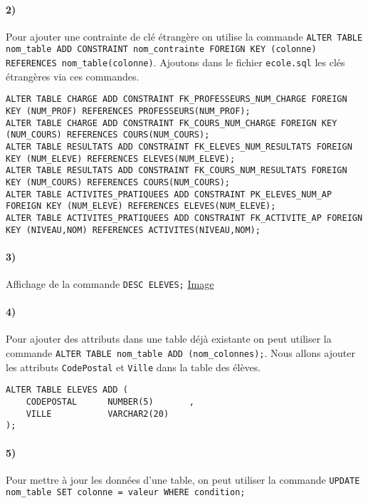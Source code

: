 \documentclass{report}
\begin{document}
\paragraph{2)}Pour ajouter une contrainte de clé étrangère on utilise la commande {\tt ALTER TABLE nom\_table ADD CONSTRAINT nom\_contrainte FOREIGN KEY (colonne) REFERENCES nom\_table(colonne)}. Ajoutons dans le fichier {\tt ecole.sql} les clés étrangères via ces commandes.

\begin{lstlisting}
ALTER TABLE CHARGE ADD CONSTRAINT FK_PROFESSEURS_NUM_CHARGE FOREIGN KEY (NUM_PROF) REFERENCES PROFESSEURS(NUM_PROF);
ALTER TABLE CHARGE ADD CONSTRAINT FK_COURS_NUM_CHARGE FOREIGN KEY (NUM_COURS) REFERENCES COURS(NUM_COURS);
ALTER TABLE RESULTATS ADD CONSTRAINT FK_ELEVES_NUM_RESULTATS FOREIGN KEY (NUM_ELEVE) REFERENCES ELEVES(NUM_ELEVE);
ALTER TABLE RESULTATS ADD CONSTRAINT FK_COURS_NUM_RESULTATS FOREIGN KEY (NUM_COURS) REFERENCES COURS(NUM_COURS);
ALTER TABLE ACTIVITES_PRATIQUEES ADD CONSTRAINT PK_ELEVES_NUM_AP FOREIGN KEY (NUM_ELEVE) REFERENCES ELEVES(NUM_ELEVE);
ALTER TABLE ACTIVITES_PRATIQUEES ADD CONSTRAINT FK_ACTIVITE_AP FOREIGN KEY (NIVEAU,NOM) REFERENCES ACTIVITES(NIVEAU,NOM);
\end{lstlisting}

\paragraph{3)}Affichage de la commande {\tt DESC ELEVES;} \href{run:./Images/TP2/tp2_desc_eleves.png}{Image}

\paragraph{4)}Pour ajouter des attributs dans une table déjà existante on peut utiliser la commande {\tt ALTER TABLE nom\_table ADD (nom\_colonnes);}. Nous allons ajouter les attributs {\tt CodePostal} et {\tt Ville} dans la table des élèves.

\begin{lstlisting}
ALTER TABLE ELEVES ADD (
	CODEPOSTAL		NUMBER(5)		,
	VILLE			VARCHAR2(20)	
);
\end{lstlisting}

\paragraph{5)}Pour mettre à jour les données d'une table, on peut utiliser la commande {\tt UPDATE nom\_table SET colonne = \newline valeur WHERE condition;}
\end{document}
